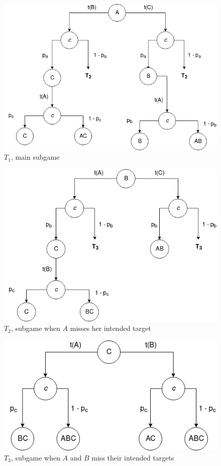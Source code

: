 \documentclass[letterpaper]{article}
\begin{document}
\begin{figure}[!ht]
 \centerline{\includegraphics[scale=0.5]{images/T1}}
 \caption{$T_1$, main subgame}
 \label{fig:t1}
\end{figure}

\begin{figure}[!ht]
 \centerline{\includegraphics[scale=0.5]{images/T2}}
 \caption{$T_2$, subgame when $A$ misses her intended target}
 \label{fig:t2}
\end{figure}

\begin{figure}[!ht]
 \centerline{\includegraphics[scale=0.5]{images/T3}}
 \caption{$T_3$, subgame when $A$ and $B$ miss their intended targets}
 \label{fig:t3}
\end{figure}
\end{document}
